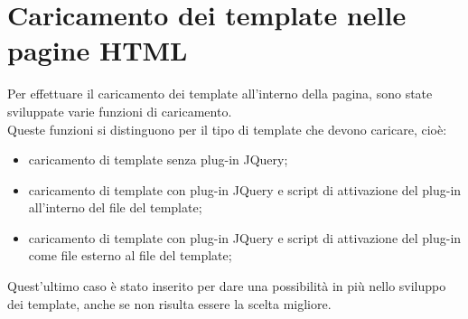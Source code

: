 \section{Caricamento dei template nelle pagine HTML}
Per effettuare il caricamento dei template all'interno della pagina, sono state sviluppate varie funzioni di caricamento.\\
Queste funzioni si distinguono per il tipo di template che devono caricare, cioè:
\begin{itemize}
	\item caricamento di template senza plug-in JQuery;
	\item caricamento di template con plug-in JQuery e script di attivazione del plug-in all'interno del file del template;
	\item caricamento di template con plug-in JQuery e script di attivazione del plug-in come file esterno al file del template;
\end{itemize} 
Quest'ultimo caso è stato inserito per dare una possibilità in più nello sviluppo dei template, anche se non risulta essere la scelta migliore.\\

